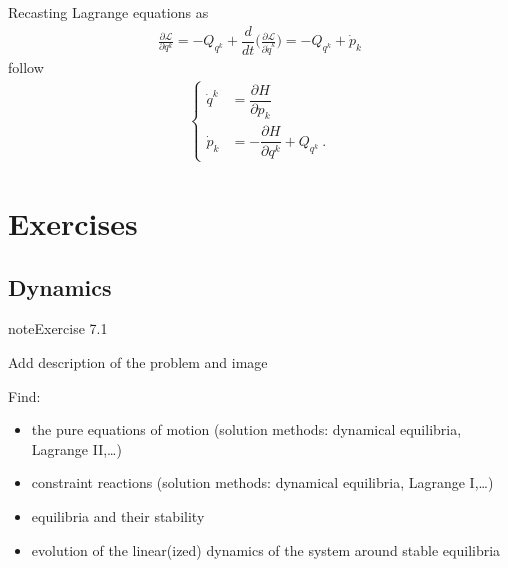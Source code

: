 \documentclass[letterpaper,10pt,english]{jupyterBook}
\begin{document}
\sphinxAtStartPar
Recasting Lagrange equations as
\begin{equation*}
\begin{split}\frac{\partial \mathscr{L}}{\partial q^k} = - Q_{q^k} + \dfrac{d}{dt}\Big( \frac{\partial \mathscr{L}}{\partial \dot{q}^k} \Big) = -Q_{q^k} + \dot{p}_k\end{split}
\end{equation*}
\sphinxAtStartPar
{} follow
\begin{equation*}
\begin{split}\begin{cases}
 \dot{q}^k & = \dfrac{\partial H}{\partial p_k} \\
 \dot{p}_k & =-\dfrac{\partial H}{\partial q^k} + Q_{q^k} \ .
\end{cases}\end{split}
\end{equation*}
\sphinxstepscope


\part{Exercises}

\sphinxstepscope


\chapter{Dynamics}
\label{\detokenize{ch/exercises-dynamics:dynamics}}\label{\detokenize{ch/exercises-dynamics:classical-mechanics-exercise-dynamics}}\label{\detokenize{ch/exercises-dynamics::doc}}

 \label{exercise:ch/exercises-dynamics-exercise-0}

\begin{sphinxadmonition}{note}{Exercise 7.1}



\sphinxAtStartPar
{} Add description of the problem and image

\sphinxAtStartPar
Find:
\begin{itemize}
\item {} 
\sphinxAtStartPar
the pure equations of motion (solution methods: dynamical equilibria, Lagrange II,…) 

\item {} 
\sphinxAtStartPar
constraint reactions (solution methods: dynamical equilibria, Lagrange I,…) 

\item {} 
\sphinxAtStartPar
equilibria and their stability 

\item {} 
\sphinxAtStartPar
evolution of the linear(ized) dynamics of the system around stable equilibria 

\end{itemize}
\end{sphinxadmonition}
\end{document}
